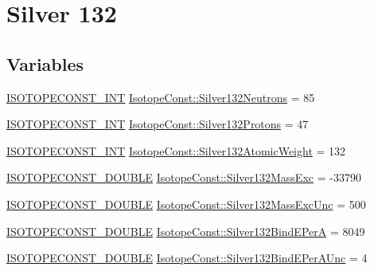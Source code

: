 \hypertarget{group___isotope_const-_silver-_ag132}{}\section{Silver 132}
\label{group___isotope_const-_silver-_ag132}
\subsection*{Variables}
\begin{DoxyCompactItemize}
\item 
\mbox{\hyperlink{group___isotope_const-_macros_ga5f18360b3e99483a35c32d789e62621c}{I\+S\+O\+T\+O\+P\+E\+C\+O\+N\+S\+T\+\_\+\+I\+NT}} \mbox{\hyperlink{group___isotope_const-_silver-_ag132_gaf72368e24942d8fc853b1456a0e1750d}{Isotope\+Const\+::\+Silver132\+Neutrons}} = 85
\item 
\mbox{\hyperlink{group___isotope_const-_macros_ga5f18360b3e99483a35c32d789e62621c}{I\+S\+O\+T\+O\+P\+E\+C\+O\+N\+S\+T\+\_\+\+I\+NT}} \mbox{\hyperlink{group___isotope_const-_silver-_ag132_gadc1ebc2309f6dd8454e66a5ab7db6ffa}{Isotope\+Const\+::\+Silver132\+Protons}} = 47
\item 
\mbox{\hyperlink{group___isotope_const-_macros_ga5f18360b3e99483a35c32d789e62621c}{I\+S\+O\+T\+O\+P\+E\+C\+O\+N\+S\+T\+\_\+\+I\+NT}} \mbox{\hyperlink{group___isotope_const-_silver-_ag132_ga0cd437241f09f0c7dfabc9259dff4129}{Isotope\+Const\+::\+Silver132\+Atomic\+Weight}} = 132
\item 
\mbox{\hyperlink{group___isotope_const-_macros_ga8f45a7272ce02c0b4c65c44636ed719a}{I\+S\+O\+T\+O\+P\+E\+C\+O\+N\+S\+T\+\_\+\+D\+O\+U\+B\+LE}} \mbox{\hyperlink{group___isotope_const-_silver-_ag132_ga5d6a49f35c7775fc19bd26808b9854e7}{Isotope\+Const\+::\+Silver132\+Mass\+Exc}} = -\/33790
\item 
\mbox{\hyperlink{group___isotope_const-_macros_ga8f45a7272ce02c0b4c65c44636ed719a}{I\+S\+O\+T\+O\+P\+E\+C\+O\+N\+S\+T\+\_\+\+D\+O\+U\+B\+LE}} \mbox{\hyperlink{group___isotope_const-_silver-_ag132_gacd5951423e03f851f093ccbbddbd0d2e}{Isotope\+Const\+::\+Silver132\+Mass\+Exc\+Unc}} = 500
\item 
\mbox{\hyperlink{group___isotope_const-_macros_ga8f45a7272ce02c0b4c65c44636ed719a}{I\+S\+O\+T\+O\+P\+E\+C\+O\+N\+S\+T\+\_\+\+D\+O\+U\+B\+LE}} \mbox{\hyperlink{group___isotope_const-_silver-_ag132_ga1a281add4647b090c50795efd99c722e}{Isotope\+Const\+::\+Silver132\+Bind\+E\+PerA}} = 8049
\item 
\mbox{\hyperlink{group___isotope_const-_macros_ga8f45a7272ce02c0b4c65c44636ed719a}{I\+S\+O\+T\+O\+P\+E\+C\+O\+N\+S\+T\+\_\+\+D\+O\+U\+B\+LE}} \mbox{\hyperlink{group___isotope_const-_silver-_ag132_ga538cd249ee7ca74640aadfc329b21367}{Isotope\+Const\+::\+Silver132\+Bind\+E\+Per\+A\+Unc}} = 4

\end{DoxyCompactItemize}
